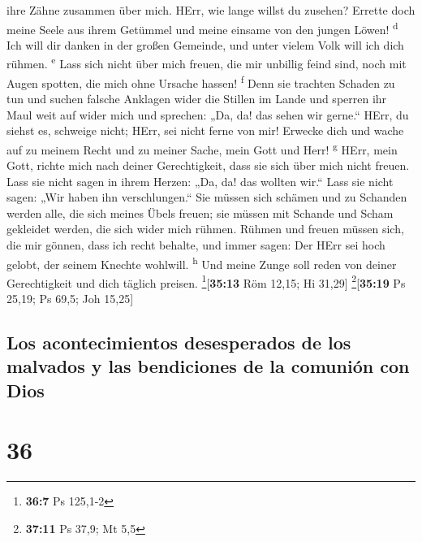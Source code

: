 ihre Zähne zusammen über mich.  HErr, wie lange willst du
zusehen? Errette doch meine Seele aus ihrem Getümmel und meine einsame
von den jungen Löwen! \textsuperscript{d}  Ich will dir
danken in der großen Gemeinde, und unter vielem Volk will ich dich
rühmen. \textsuperscript{e}  Lass sich nicht über mich
freuen, die mir unbillig feind sind, noch mit Augen spotten, die mich
ohne Ursache hassen! \textsuperscript{f}  Denn sie
trachten Schaden zu tun und suchen falsche Anklagen wider die Stillen im
Lande  und sperren ihr Maul weit auf wider mich und
sprechen: „Da, da! das sehen wir gerne.``  HErr, du
siehst es, schweige nicht; HErr, sei nicht ferne von mir!
 Erwecke dich und wache auf zu meinem Recht und zu meiner
Sache, mein Gott und Herr! \textsuperscript{g}  HErr,
mein Gott, richte mich nach deiner Gerechtigkeit, dass sie sich über
mich nicht freuen.  Lass sie nicht sagen in ihrem Herzen:
„Da, da! das wollten wir.`` Lass sie nicht sagen: „Wir haben ihn
verschlungen.``  Sie müssen sich schämen und zu Schanden
werden alle, die sich meines Übels freuen; sie müssen mit Schande und
Scham gekleidet werden, die sich wider mich rühmen. 
Rühmen und freuen müssen sich, die mir gönnen, dass ich recht behalte,
und immer sagen: Der HErr sei hoch gelobt, der seinem Knechte wohlwill.
\textsuperscript{h}  Und meine Zunge soll reden von
deiner Gerechtigkeit und dich täglich preisen.
\footnote{\textbf{36:7} Ps 125,1-2}{[}\textbf{35:13} Röm 12,15; Hi
31,29{]} \footnote{\textbf{37:11} Ps 37,9; Mt 5,5}{[}\textbf{35:19} Ps
25,19; Ps 69,5; Joh 15,25{]}

\hypertarget{los-acontecimientos-desesperados-de-los-malvados-y-las-bendiciones-de-la-comuniuxf3n-con-dios}{%
\subsection{Los acontecimientos desesperados de los malvados y las
bendiciones de la comunión con
Dios}\label{los-acontecimientos-desesperados-de-los-malvados-y-las-bendiciones-de-la-comuniuxf3n-con-dios}}

\hypertarget{section-35}{%
\section{36}\label{section-35}}

